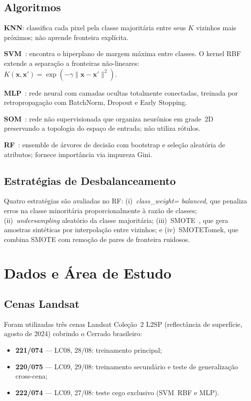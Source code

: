 \documentclass[conference]{IEEEtran}
\begin{document}
\subsection{Algoritmos}

\textbf{KNN}: classifica cada pixel pela classe majoritária entre seus
$K$ vizinhos mais próximos; não aprende fronteira explícita.

\textbf{SVM}~\cite{b7}: encontra o hiperplano de margem máxima entre
classes. O kernel RBF extende a separação a fronteiras não-lineares:
$K(\mathbf{x},\mathbf{x}') = \exp(-\gamma\|\mathbf{x}-\mathbf{x}'\|^2)$.

\textbf{MLP}~\cite{b9}: rede neural com camadas ocultas totalmente
conectadas, treinada por retropropagação com BatchNorm, Dropout e
Early Stopping.

\textbf{SOM}~\cite{b8}: rede não supervisionada que organiza neurônios
em grade~2D preservando a topologia do espaço de entrada; não utiliza
rótulos.

\textbf{RF}~\cite{b3}: ensemble de árvores de decisão com bootstrap
e seleção aleatória de atributos; fornece importância via impureza Gini.

\subsection{Estratégias de Desbalanceamento}

Quatro estratégias são avaliadas no RF: (i)~\textit{class\_weight=
balanced}, que penaliza erros na classe minoritária proporcionalmente
à razão de classes; (ii)~\textit{undersampling} aleatório da classe
majoritária; (iii)~SMOTE~\cite{b5}, que gera amostras sintéticas por
interpolação entre vizinhos; e (iv)~SMOTETomek, que combina SMOTE com
remoção de pares de fronteira ruidosos.

\section{Dados e Área de Estudo}

\subsection{Cenas Landsat}

Foram utilizadas três cenas Landsat Coleção~2 L2SP (reflectância de
superfície, agosto de 2024) cobrindo o Cerrado brasileiro:

\begin{itemize}
  \item \textbf{221/074} — LC08, 28/08: treinamento principal;
  \item \textbf{220/075} — LC09, 29/08: treinamento secundário e teste
        de generalização cross-cena;
  \item \textbf{222/074} — LC09, 27/08: teste cego exclusivo (SVM~RBF
        e MLP).
\end{itemize}
\end{document}
